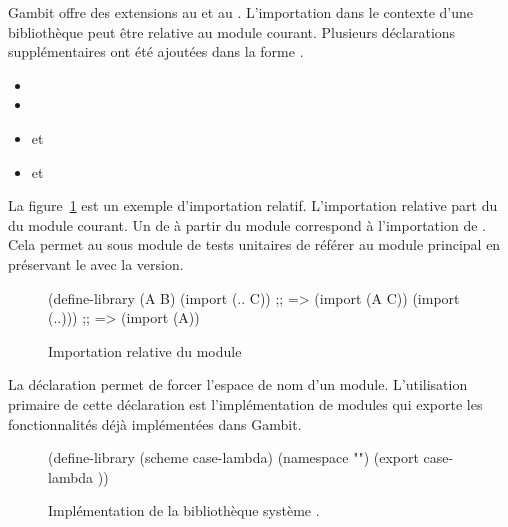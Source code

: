 Gambit offre des extensions au  et au .
L'importation dans le contexte d'une bibliothèque peut être relative au module
courant. Plusieurs déclarations supplémentaires ont été ajoutées dans la forme
.

\begin{itemize}
  \item {}
  \item {}
  \item {} et 
  \item {} et 
\end{itemize}


La figure~\ref{fig:relative-import} est un exemple d'importation
relatif.  L'importation relative part
du  du module courant.
Un  de  à partir du module 
correspond à l'importation de . Cela permet au sous
module de tests unitaires de référer au module principal en préservant le
 avec la version. \\

\begin{figure}[ht]
  \centering
  \begin{mplisting}{0.8}
(define-library (A B)
  (import (.. C))  ;; => (import (A C))
  (import (..))) ;; => (import (A))
\end{mplisting}
  \caption{Importation relative du module }
  \label{fig:relative-import}
\end{figure}

La déclaration  permet de forcer l'espace de nom d'un module.
L'utilisation primaire de cette déclaration est l'implémentation de modules qui
exporte les fonctionnalités déjà implémentées dans Gambit. \\

\begin{figure}[ht]
  \begin{mplisting}{0.8}
(define-library (scheme case-lambda)
  (namespace "")
  (export
case-lambda
))
\end{mplisting}
  \caption{Implémentation de la bibliothèque système .}
  \label{fig:module->scheme/case-lambda}
\end{figure}

